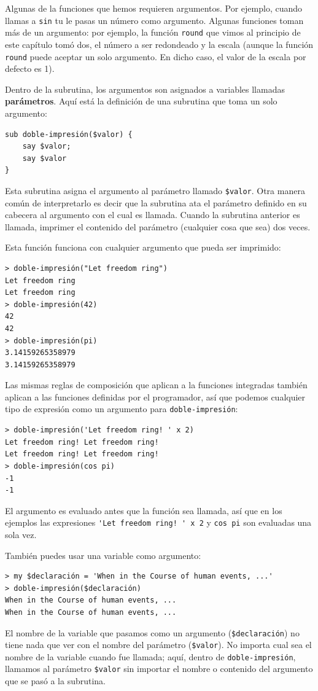 Algunas de la funciones que hemos requieren argumentos. Por ejemplo,
cuando llamas a {\tt sin} tu le pasas un número como argumento. Algunas
funciones toman más de un argumento: por ejemplo, la función {\tt round}
que vimos al principio de este capítulo tomó dos, el número a ser redondeado
y la escala (aunque la función {\tt round} puede aceptar un solo 
argumento. En dicho caso, el valor de la escala por defecto es 1).
 
Dentro de la subrutina, los argumentos son asignados a variables llamadas 
{\bf parámetros}. Aquí está la definición de una subrutina que toma un 
solo argumento:

\begin{lstlisting}
sub doble-impresión($valor) {
    say $valor;
    say $valor
}
\end{lstlisting}
%
Esta subrutina asigna el argumento al parámetro llamado
\verb|$valor|. Otra manera común de interpretarlo es decir que
la subrutina ata el parámetro definido en su cabecera al argumento
con el cual es llamada. Cuando la subrutina anterior es llamada, 
imprimer el contenido del parámetro (cualquier cosa que sea) dos
veces.

Esta función funciona con cualquier argumento que pueda ser
imprimido:

\begin{lstlisting}
> doble-impresión("Let freedom ring")
Let freedom ring
Let freedom ring
> doble-impresión(42)
42
42
> doble-impresión(pi)
3.14159265358979
3.14159265358979
\end{lstlisting}
%
Las mismas reglas de composición que aplican a la funciones integradas 
también aplican a las funciones definidas por el programador, así que podemos
cualquier tipo de expresión como un argumento para \verb|doble-impresión|:

\begin{lstlisting}
> doble-impresión('Let freedom ring! ' x 2)
Let freedom ring! Let freedom ring! 
Let freedom ring! Let freedom ring! 
> doble-impresión(cos pi)
-1
-1
\end{lstlisting}
%
El argumento es evaluado antes que la función sea llamada, 
así que en los ejemplos las expresiones \verb"'Let freedom ring! ' x 2" 
y {\tt cos pi} son evaluadas una sola vez.

También puedes usar una variable como argumento:

\begin{lstlisting}
> my $declaración = 'When in the Course of human events, ...'
> doble-impresión($declaración)
When in the Course of human events, ...
When in the Course of human events, ...
\end{lstlisting}
%
El nombre de la variable que pasamos como un argumento (\verb|$declaración|)
no tiene nada que ver con el nombre del parámetro (\verb|$valor|). No
importa cual sea el nombre de la variable cuando fue llamada;
aquí, dentro de \verb|doble-impresión|, llamamos al parámetro 
\verb|$valor| sin importar el nombre o contenido del argumento que se
pasó a la subrutina.


